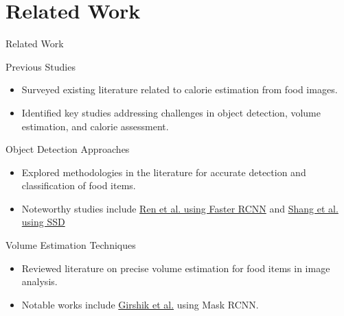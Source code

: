 \documentclass{beamer}
\begin{document}
	\section{Related Work}
	\begin{frame}{Related Work}
		\begin{block}{Previous Studies}\scriptsize
			\begin{itemize}
				\item Surveyed existing literature related to calorie estimation from food images.
				\item Identified key studies addressing challenges in object detection, volume estimation, and calorie assessment.
			\end{itemize}
		\end{block}
		\begin{block}{Object Detection Approaches}\scriptsize
			\begin{itemize}
				\item Explored methodologies in the literature for accurate detection and classification of food items.
				\item Noteworthy studies include \href{https://proceedings.neurips.cc/paper_files/paper/2015/file/14bfa6bb14875e45bba028a21ed38046-Paper.pdf}{Ren et al. using Faster RCNN} and \href{https://ieeexplore.ieee.org/stamp/stamp.jsp?arnumber=8978787}{Shang et al. using SSD}
			\end{itemize}
		\end{block}
		\begin{block}{Volume Estimation Techniques}\scriptsize
				\begin{itemize}
				\item Reviewed literature on precise volume estimation for food items in image analysis.
				\item Notable works include \href{https://arxiv.org/abs/1703.06870}{Girshik et al.} using Mask RCNN.
			\end{itemize}
		\end{block}
	\end{frame}
	
\end{document}

